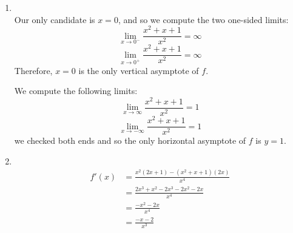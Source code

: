 \documentclass{ximera}
\begin{document}
\begin{problem}
\begin{explanation}
\begin{enumerate}
       Note that $f(1) = 3$ and $f(-1) = 1$.
       So it cannot be for all values of $x$ that either $f(-x) = f(x)$ or $f(-x) = -f(x)$.
       So $f$ is neither even nor odd, and therefore $f$ has no symmetry.
			
     \item
         \\

         Our only candidate is $x=0$, and so we compute the two one-sided limits:
       \[
         \lim_{x \to 0^-} \frac{x^2+x+1}{x^2} = \infty 
       \]
       \[
         \lim_{x \to 0^+} \frac{x^2+x+1}{x^2} = \infty
       \]
       Therefore, $x=0$ is the only vertical asymptote of $f$.

         We compute the following limits:
       \[
         \lim_{x \to \infty} \frac{x^2+x+1}{x^2} = 1
       \]
       \[
         \lim_{x \to -\infty} \frac{x^2+x+1}{x^2} = 1
       \]
       we checked both ends and so the only horizontal asymptote of $f$ is $y=1$.
			

			
     \item
         \\

       \begin{align*}
         f'(x) &= \frac{x^2(2x+1) - (x^2+x+1)(2x)}{x^4} \\
               &= \frac{2x^3 + x^2 - 2x^3 - 2x^2 - 2x}{x^4} \\
               &= \frac{-x^2 - 2x}{x^4} \\
               &= \frac{-x-2}{x^3}
       \end{align*}
			

\end{enumerate}
\end{explanation}
\end{problem}
\end{document}
